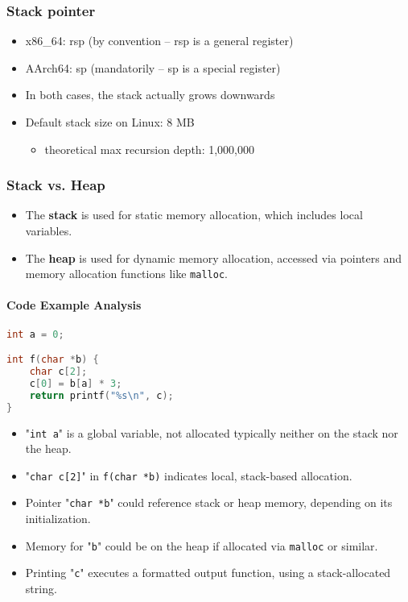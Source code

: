 \documentclass[12pt]{article}
\begin{document}
\subsubsection{Stack pointer}
\begin{itemize}
    \item x86\_64: rsp (by convention -- rsp is a general register)
    \item AArch64: sp (mandatorily -- sp is a special register)
    \item In both cases, the stack actually grows downwards
    \item Default stack size on Linux: 8 MB
    \begin{itemize}
        \item theoretical max recursion depth: 1,000,000
    \end{itemize}
\end{itemize}

\subsubsection{Stack vs. Heap}
\begin{itemize}
    \item The \textbf{stack} is used for static memory allocation, which includes local variables.
    \item The \textbf{heap} is used for dynamic memory allocation, accessed via pointers and memory allocation functions like \texttt{malloc}.
\end{itemize}

\paragraph{Code Example Analysis}
\begin{lstlisting}[language=C]
int a = 0;

int f(char *b) {
    char c[2];
    c[0] = b[a] * 3;
    return printf("%s\n", c);
}
\end{lstlisting}

\begin{itemize}
    \item "\texttt{int a}" is a global variable, not allocated  typically neither on the stack nor the heap.
    \item "\texttt{char c[2]}" in \texttt{f(char *b)} indicates local, stack-based allocation.
    \item Pointer "\texttt{char *b}" could reference stack or heap memory, depending on its initialization.
    \item Memory for "\texttt{b}" could be on the heap if allocated via \texttt{malloc} or similar.
    \item Printing "\texttt{c}" executes a formatted output function, using a stack-allocated string.
\end{itemize}
\end{document}
